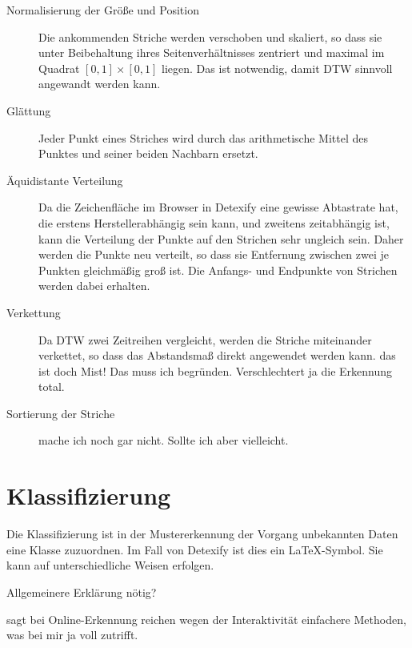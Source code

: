 \begin{description}
  \item[Normalisierung der Größe und Position]
    Die ankommenden Striche werden verschoben und skaliert, so dass sie unter Beibehaltung ihres Seitenverhältnisses zentriert und maximal im Quadrat $[0,1]\times[0,1]$ liegen. Das ist notwendig, damit \ac{DTW} sinnvoll angewandt werden kann.
  \item[Glättung]
    Jeder Punkt eines Striches wird durch das arithmetische Mittel des Punktes und seiner beiden Nachbarn ersetzt.
  \item[Äquidistante Verteilung]
    Da die Zeichenfläche im Browser in Detexify eine gewisse Abtastrate hat, die erstens Herstellerabhängig sein kann, und zweitens zeitabhängig ist, kann die Verteilung der Punkte auf den Strichen sehr ungleich sein. Daher werden die Punkte neu verteilt, so dass sie Entfernung zwischen zwei je Punkten gleichmäßig groß ist. Die Anfangs- und Endpunkte von Strichen werden dabei erhalten.
  \item[Verkettung]
    Da \ac{DTW} zwei Zeitreihen vergleicht, werden die Striche miteinander verkettet, so dass das Abstandsmaß direkt angewendet werden kann. \TODO das ist doch Mist! Das muss ich begründen. Verschlechtert ja die Erkennung total.
  \item[Sortierung der Striche]
    \TODO mache ich noch gar nicht. Sollte ich aber vielleicht.
\end{description}


\section{Klassifizierung} %
\label{sec:klassifizierung}

Die Klassifizierung ist in der Mustererkennung der Vorgang unbekannten Daten eine Klasse zuzuordnen. Im Fall von Detexify ist dies ein \LaTeX-Symbol. Sie kann auf unterschiedliche Weisen erfolgen.

\TODO Allgemeinere Erklärung nötig?



\citet{Tappert:1990p10302} sagt bei Online-Erkennung reichen wegen der Interaktivität einfachere Methoden, was bei mir ja voll zutrifft.

